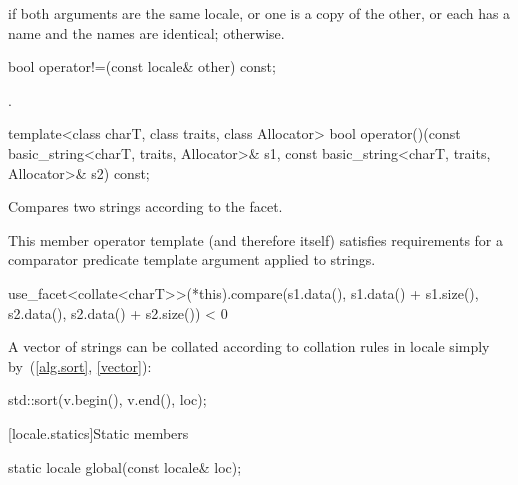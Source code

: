 \begin{itemdescr}
\pnum
\returns
{}
if both arguments are the same locale, or one is a copy of the
other, or each has a name and the names are identical;
otherwise.
\end{itemdescr}

%
\begin{itemdecl}
bool operator!=(const locale& other) const;
\end{itemdecl}

\begin{itemdescr}
\pnum
\returns {}.
\end{itemdescr}

%
\begin{itemdecl}
template<class charT, class traits, class Allocator>
  bool operator()(const basic_string<charT, traits, Allocator>& s1,
                  const basic_string<charT, traits, Allocator>& s2) const;
\end{itemdecl}

\begin{itemdescr}
\pnum
\effects
Compares two strings according to the
facet.

\pnum
\remarks
This member operator template (and therefore
itself) satisfies requirements for a comparator predicate template argument
applied to strings.

\pnum
\returns
\begin{codeblock}
use_facet<collate<charT>>(*this).compare(s1.data(), s1.data() + s1.size(),
                                         s2.data(), s2.data() + s2.size()) < 0
\end{codeblock}

\pnum
\begin{example}
A vector of strings
can be collated according to collation rules in locale
simply by~(\ref{alg.sort}, \ref{vector}):

\begin{codeblock}
std::sort(v.begin(), v.end(), loc);
\end{codeblock}
\end{example}
\end{itemdescr}

[locale.statics]{Static members}

%
\begin{itemdecl}
static locale global(const locale& loc);
\end{itemdecl}

